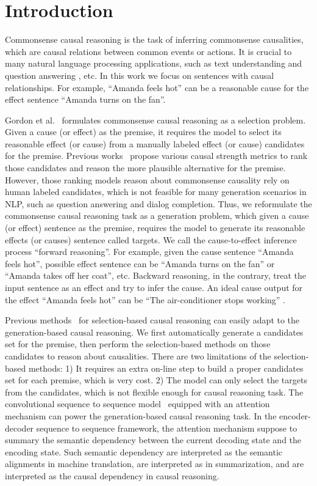\section{Introduction}
Commonsense causal reasoning is the task of inferring commonsense causalities, which are causal relations
between common events or actions. 
It is crucial to many natural language processing applications, such as text understanding and question answering , etc.
In this work we focus on sentences with causal relationships. For example, ``Amanda feels hot'' can be a reasonable cause for the effect sentence ``Amanda turns on the fan''. 

Gordon et al.~ formulates commonsense causal reasoning as a selection problem.
Given a cause (or effect) as the premise, 
it requires the model to select its reasonable effect (or cause) 
from a manually labeled effect (or cause) candidates for the premise.
Previous works~\cite{} propose various causal strength metrics to rank those candidates and reason the more plausible alternative for the premise.
However, those ranking models reason about commonsense causality rely on human labeled candidates, which is not feasible for many generation scenarios in NLP, such as question answering and dialog completion.
Thus, we reformulate the commonsense causal reasoning task as a generation problem, which given a cause (or effect) sentence as the premise, requires the model to generate its reasonable effects (or causes) sentence called targets. We call the cause-to-effect inference process ``forward reasoning''. For example, given the cause sentence ``Amanda feels hot'', possible effect sentence can be ``Amanda turns on the fan'' or ``Amanda takes off her coat'', etc. Backward reasoning, in the contrary, treat the input sentence as an effect and try to infer the cause. An ideal cause output for the effect ``Amanda feels hot'' can be ``The air-conditioner stops working'' .

Previous methods~\cite{} for selection-based causal reasoning can easily adapt to the generation-based causal reasoning.
We first automatically generate a candidates set for the premise, then perform the selection-based methods on those candidates to reason about causalities.
There are two limitations of the selection-based methods: 1) It requires an extra on-line step to build a proper candidates set for each premise, which is very cost. 2) The model can only select the targets from the candidates, which is not flexible enough for causal reasoning task.
The convolutional sequence to sequence model~\cite{gehring2017convs2s} equipped with an attention mechanism can power the generation-based causal reasoning task.
In the encoder-decoder sequence to sequence framework, the attention mechanism suppose to summary the semantic dependency between the current decoding state and the encoding state. 
Such semantic dependency are interpreted as
the semantic alignments in machine translation,
are interpreted as  in summarization, 
and are interpreted as the causal dependency in causal reasoning.

